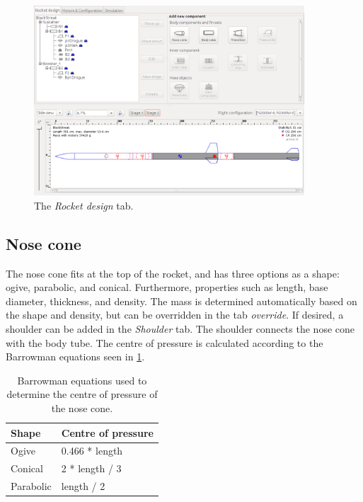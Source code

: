 \documentclass[11pt, a4paper]{article}
\begin{document}
\begin{figure}[]
  \caption{The \emph{Rocket design} tab.}
  \label{fig:tab-design}
  \centering
    \includegraphics[width=0.9\textwidth]{r-design.png}
\end{figure}

\subsection{Nose cone}

The nose cone fits at the top of the rocket, and has three options as a shape: ogive, parabolic, and conical. Furthermore, properties such as length, base diameter, thickness, and density. The mass is determined automatically based on the shape and density, but can be overridden in the tab \emph{override}. If desired, a shoulder can be added in the \emph{Shoulder} tab. The shoulder connects the nose cone with the body tube.
% 
The centre of pressure is calculated according to the Barrowman equations seen in \cref{table:barrowman}.

\begin{table}[]
\centering
\caption{Barrowman equations used to determine the centre of pressure of the nose cone.}
\label{table:barrowman}
\begin{tabular}{|l|l|}
\hline
\textbf{Shape} & \textbf{Centre of pressure} \\ \hline
Ogive          & 0.466 * length              \\ \hline
Conical        & 2 * length / 3              \\ \hline
Parabolic      & length / 2                  \\ \hline
\end{tabular}
\end{table}
\end{document}
